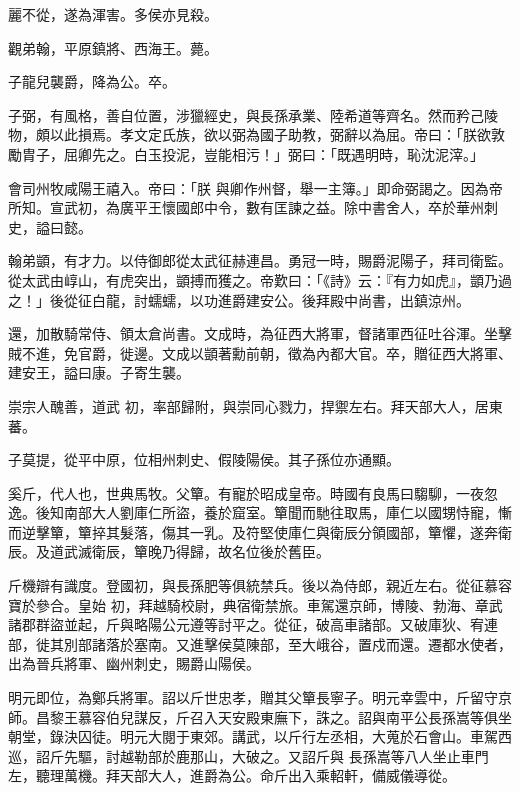 \begin{pinyinscope}
 麗不從，遂為渾害。多侯亦見殺。



 觀弟翰，平原鎮將、西海王。薨。



 子龍兒襲爵，降為公。卒。



 子弼，有風格，善自位置，涉獵經史，與長孫承業、陸希道等齊名。然而矜己陵物，頗以此損焉。孝文定氏族，欲以弼為國子助教，弼辭以為屈。帝曰：「朕欲敦勵胄子，屈卿先之。白玉投泥，豈能相污！」弼曰：「既遇明時，恥沈泥滓。」



 會司州牧咸陽王禧入。帝曰：「朕
 與卿作州督，舉一主簿。」即命弼謁之。因為帝所知。宣武初，為廣平王懷國郎中令，數有匡諫之益。除中書舍人，卒於華州刺史，謚曰懿。



 翰弟顗，有才力。以侍御郎從太武征赫連昌。勇冠一時，賜爵泥陽子，拜司衛監。從太武由崞山，有虎突出，顗搏而獲之。帝歎曰：「《詩》云：『有力如虎』，顗乃過之！」後從征白龍，討蠕蠕，以功進爵建安公。後拜殿中尚書，出鎮涼州。



 還，加散騎常侍、領太倉尚書。文成時，為征西大將軍，督諸軍西征吐谷渾。坐擊賊不進，免官爵，徙邊。文成以顗著勳前朝，徵為內都大官。卒，贈征西大將軍、建安王，謚曰康。子寄生襲。



 崇宗人醜善，道武
 初，率部歸附，與崇同心戮力，捍禦左右。拜天部大人，居東蕃。



 子莫提，從平中原，位相州刺史、假陵陽侯。其子孫位亦通顯。



 奚斤，代人也，世典馬牧。父簞。有寵於昭成皇帝。時國有良馬曰騶駠，一夜忽逸。後知南部大人劉庫仁所盜，養於窟室。簞聞而馳往取馬，庫仁以國甥恃寵，慚而逆擊簞，簞捽其髮落，傷其一乳。及符堅使庫仁與衛辰分領國部，簞懼，遂奔衛辰。及道武滅衛辰，簞晚乃得歸，故名位後於舊臣。



 斤機辯有識度。登國初，與長孫肥等俱統禁兵。後以為侍郎，親近左右。從征慕容寶於參合。皇始
 初，拜越騎校尉，典宿衛禁旅。車駕還京師，博陵、勃海、章武諸郡群盜並起，斤與略陽公元遵等討平之。從征，破高車諸部。又破庫狄、宥連部，徙其別部諸落於塞南。又進擊侯莫陳部，至大峨谷，置戍而還。遷都水使者，出為晉兵將軍、幽州刺史，賜爵山陽侯。



 明元即位，為鄭兵將軍。詔以斤世忠孝，贈其父簞長寧子。明元幸雲中，斤留守京師。昌黎王慕容伯兒謀反，斤召入天安殿東廡下，誅之。詔與南平公長孫嵩等俱坐朝堂，錄決囚徒。明元大閱于東郊。講武，以斤行左丞相，大蒐於石會山。車駕西巡，詔斤先驅，討越勒部於鹿那山，大破之。又詔斤與
 長孫嵩等八人坐止車門左，聽理萬機。拜天部大人，進爵為公。命斤出入乘軺軒，備威儀導從。




\end{pinyinscope}
